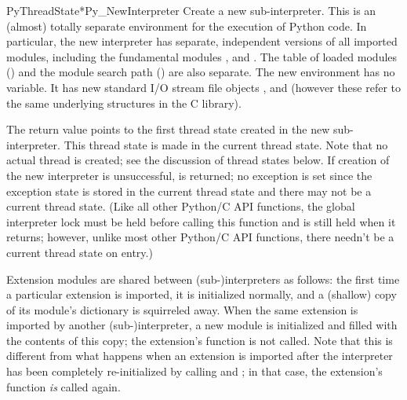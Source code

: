 \begin{cfuncdesc}{PyThreadState*}{Py_NewInterpreter}{}
  Create a new sub-interpreter.  This is an (almost) totally separate
  environment for the execution of Python code.  In particular, the
  new interpreter has separate, independent versions of all imported
  modules, including the fundamental modules
  ,
   and
  .  The table of loaded modules
  () and the module search path ()
  are also separate.  The new environment has no 
  variable.  It has new standard I/O stream file objects
  ,  and  (however
  these refer to the same underlying  structures in the C
  library).

  The return value points to the first thread state created in the new
  sub-interpreter.  This thread state is made in the current thread
  state.  Note that no actual thread is created; see the discussion of
  thread states below.  If creation of the new interpreter is
  unsuccessful, \NULL{} is returned; no exception is set since the
  exception state is stored in the current thread state and there may
  not be a current thread state.  (Like all other Python/C API
  functions, the global interpreter lock must be held before calling
  this function and is still held when it returns; however, unlike
  most other Python/C API functions, there needn't be a current thread
  state on entry.)

  Extension modules are shared between (sub-)interpreters as follows:
  the first time a particular extension is imported, it is initialized
  normally, and a (shallow) copy of its module's dictionary is
  squirreled away.  When the same extension is imported by another
  (sub-)interpreter, a new module is initialized and filled with the
  contents of this copy; the extension's  function is not
  called.  Note that this is different from what happens when an
  extension is imported after the interpreter has been completely
  re-initialized by calling
   and
  ; in that case,
  the extension's  function \emph{is} called
  again.


\end{cfuncdesc}
